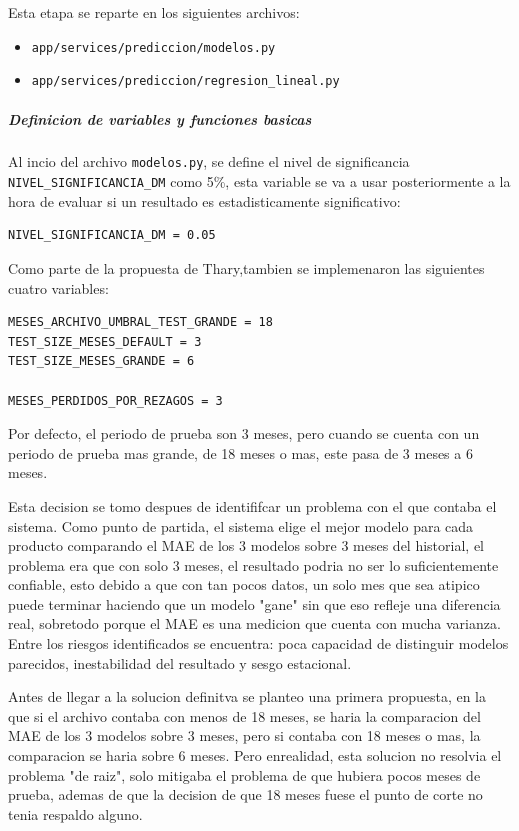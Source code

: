 Esta etapa se reparte en los siguientes archivos:

\begin{itemize}
\item \texttt{app/services/prediccion/modelos.py}
\item \texttt{app/services/prediccion/regresion\_lineal.py}
\end{itemize}

\subparagraph{Definicion de variables y funciones basicas}

Al incio del archivo \texttt{modelos.py}, se define el nivel de significancia \texttt{NIVEL\_SIGNIFICANCIA\_DM} como 5\%, esta variable se va a usar posteriormente a la hora de evaluar si un resultado es estadisticamente significativo:

\begin{verbatim}
NIVEL_SIGNIFICANCIA_DM = 0.05
\end{verbatim}

Como parte de la propuesta de Thary,tambien se implemenaron las siguientes cuatro variables:

\begin{verbatim}
MESES_ARCHIVO_UMBRAL_TEST_GRANDE = 18
TEST_SIZE_MESES_DEFAULT = 3
TEST_SIZE_MESES_GRANDE = 6

MESES_PERDIDOS_POR_REZAGOS = 3
\end{verbatim}

Por defecto, el periodo de prueba son 3 meses, pero cuando se cuenta con un periodo de prueba mas grande, de 18 meses o mas, este pasa de 3 meses a 6 meses.

Esta decision se tomo despues de identififcar un problema con el que contaba el sistema. Como punto de partida, el sistema elige el mejor modelo para cada producto comparando el MAE de los 3 modelos sobre 3 meses del historial, el problema era que con solo 3 meses, el resultado podria no ser lo suficientemente confiable, esto debido a que con tan pocos datos, un solo mes que sea atipico puede terminar haciendo que un modelo "gane" sin que eso refleje una diferencia real, sobretodo porque el MAE es una medicion que cuenta con mucha varianza. Entre los riesgos identificados se encuentra: poca capacidad de distinguir modelos parecidos, inestabilidad del resultado y sesgo estacional.

Antes de llegar a la solucion definitva se planteo una primera propuesta, en la que si el archivo contaba con menos de 18 meses, se haria la comparacion del MAE de los 3 modelos sobre 3 meses, pero si contaba con 18 meses o mas, la comparacion se haria sobre 6 meses. Pero enrealidad, esta solucion no resolvia el problema "de raiz", solo mitigaba el problema de que hubiera pocos meses de prueba, ademas de que la decision de que 18 meses fuese el punto de corte no tenia respaldo alguno.

